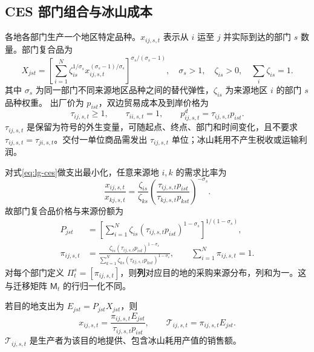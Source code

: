 \documentclass[UTF8,a4paper,zihao=-4,fontset=windows]{ctexart}
\numberwithin{equation}{section}
\begin{document}
\subsection{CES 部门组合与冰山成本}
各地各部门生产一个地区特定品种。$x_{ij,s,t}$ 表示从 $i$ 运至 $j$ 并实际到达的部门 $s$ 数量。部门复合品为
\begin{equation}
 X_{jst}=\left[\sum_{i=1}^N\zeta_{is}^{1/\sigma_s}
 x_{ij,s,t}^{(\sigma_s-1)/\sigma_s}\right]^{\sigma_s/(\sigma_s-1)},
 \quad \sigma_s>1,\quad\zeta_{is}>0,\quad\sum_i\zeta_{is}=1.
 \label{eq:lg-ces}
\end{equation}
其中 $\sigma_s$ 为同一部门不同来源地区品种之间的替代弹性，$\zeta_{is}$ 为来源地区 $i$ 的部门 $s$ 品种权重。
出厂价为 $p_{ist}$，双边贸易成本及到岸价格为
\begin{equation}
 \tau_{ij,s,t}\geq1,\qquad\tau_{ii,s,t}=1,\qquad
 p^d_{ij,s,t}=\tau_{ij,s,t}p_{ist}.
 \label{eq:lg-trade-cost}
\end{equation}
$\tau_{ij,s,t}$ 是保留为符号的外生变量，可随起点、终点、部门和时间变化，且不要求 $\tau_{ij,s,t}=\tau_{ji,s,t}$。交付一单位商品需发出 $\tau_{ij,s,t}$ 单位；冰山耗用不产生税收或运输利润。

对式\eqref{eq:lg-ces}做支出最小化，任意来源地 $i,k$ 的需求比率为
\begin{equation}
 \frac{x_{ij,s,t}}{x_{kj,s,t}}=\frac{\zeta_{is}}{\zeta_{ks}}
 \left(\frac{\tau_{ij,s,t}p_{ist}}{\tau_{kj,s,t}p_{kst}}\right)^{-\sigma_s}.
\end{equation}
故部门复合品价格与来源份额为
\begin{align}
 P_{jst}&=\left[\sum_{i=1}^N\zeta_{is}
 (\tau_{ij,s,t}p_{ist})^{1-\sigma_s}\right]^{1/(1-\sigma_s)},
 \label{eq:lg-sector-price}\\
 \pi_{ij,s,t}&=\frac{\zeta_{is}(\tau_{ij,s,t}p_{ist})^{1-\sigma_s}}
 {\sum_{k=1}^N\zeta_{ks}(\tau_{kj,s,t}p_{kst})^{1-\sigma_s}},\qquad
 \sum_{i=1}^N\pi_{ij,s,t}=1.
 \label{eq:lg-trade-share}
\end{align}
对每个部门定义 $\Pi_t^s=[\pi_{ij,s,t}]$，则\textbf{列}对应目的地的采购来源分布，列和为一。这与迁移矩阵 $\mathsf M_t$ 的行归一化不同。

若目的地支出为 $E_{jst}=P_{jst}X_{jst}$，则
\begin{equation}
 x_{ij,s,t}=\frac{\pi_{ij,s,t}E_{jst}}{\tau_{ij,s,t}p_{ist}},\qquad
 \mathcal T_{ij,s,t}=\pi_{ij,s,t}E_{jst}.
 \label{eq:lg-trade-value}
\end{equation}
$\mathcal T_{ij,s,t}$ 是生产者为该目的地提供、包含冰山耗用产值的销售额。
\end{document}

